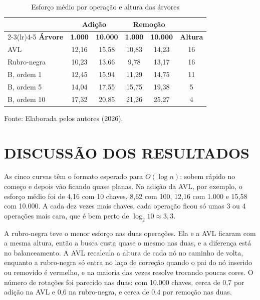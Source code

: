\begin{table}[htb]
  \centering
  \caption{Esforço médio por operação e altura das árvores}
  \label{tab:resultados}
  \begin{tabular}{@{}lccccc@{}}
    \toprule
    & \multicolumn{2}{c}{\textbf{Adição}} & \multicolumn{2}{c}{\textbf{Remoção}} & \\
    \cmidrule(lr){2-3}\cmidrule(lr){4-5}
    \textbf{Árvore} & \textbf{1.000} & \textbf{10.000} & \textbf{1.000} & \textbf{10.000} & \textbf{Altura} \\
    \midrule
    AVL                & 12,16 & 15,58 & 10,83 & 14,23 & 16 \\
    Rubro-negra        & 10,23 & 13,66 & 9,78 & 13,17 & 16 \\
    B, ordem 1         & 12,45 & 15,94 & 11,29 & 14,75 & 11 \\
    B, ordem 5         & 14,04 & 17,55 & 15,75 & 19,38 & 5 \\
    B, ordem 10        & 17,32 & 20,85 & 21,26 & 25,27 & 4 \\
    \bottomrule
  \end{tabular}
  \par\vspace{0.2\baselineskip}
  {\footnotesize Fonte: Elaborada pelos autores (2026).\par}
\end{table}

\section{DISCUSSÃO DOS RESULTADOS}

As cinco curvas têm o formato esperado para $O(\log n)$: sobem rápido no começo e depois vão ficando quase planas. Na adição da AVL, por exemplo, o esforço médio foi de 4,16 com 10 chaves, 8,62 com 100, 12,16 com 1.000 e 15,58 com 10.000. A cada dez vezes mais chaves, cada operação ficou só umas 3 ou 4 operações mais cara, que é bem perto de $\log_2 10 \approx 3{,}3$.

A rubro-negra teve o menor esforço nas duas operações. Ela e a AVL ficaram com a mesma altura, então a busca custa quase o mesmo nas duas, e a diferença está no balanceamento. A AVL recalcula a altura de cada nó no caminho de volta, enquanto a rubro-negra só entra no laço de correção quando o pai do nó inserido ou removido é vermelho, e na maioria das vezes resolve trocando poucas cores. O número de rotações foi parecido nas duas: com 10.000 chaves, cerca de 0,7 por adição na AVL e 0,6 na rubro-negra, e cerca de 0,4 por remoção nas duas.

